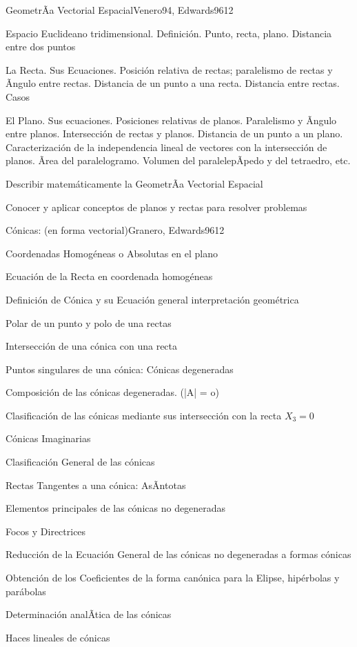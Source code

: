 \begin{syllabus}
\begin{unit}{GeometrÃ­a Vectorial Espacial}{Venero94, Edwards96}{12}
\begin{topics}
      \item Espacio Euclideano tridimensional. Definición. Punto, recta, plano. Distancia entre dos puntos
      \item La Recta. Sus Ecuaciones. Posición relativa de rectas; paralelismo de rectas y Ãngulo entre rectas. Distancia de un punto a una recta. Distancia entre rectas. Casos
      \item El Plano. Sus ecuaciones. Posiciones relativas de planos. Paralelismo y Ãngulo entre planos. Intersección de rectas y planos. Distancia de un punto a un plano. Caracterización de la independencia lineal de  vectores con la intersección de planos. Ãrea del paralelogramo. Volumen del paralelepÃ­pedo y del tetraedro, etc.
	\end{topics}

   \begin{unitgoals}
      \item Describir matemáticamente la GeometrÃ­a Vectorial Espacial
      \item Conocer y aplicar conceptos de planos y rectas para resolver problemas
   \end{unitgoals}
\end{unit}

\begin{unit}{Cónicas: (en forma vectorial)}{Granero, Edwards96}{12}
\begin{topics}
      	\item Coordenadas Homogéneas o Absolutas en el plano
	\item Ecuación de la Recta en coordenada homogéneas
	\item Definición de Cónica y su Ecuación general interpretación geométrica
	\item Polar de un punto y polo de una  rectas
	\item Intersección de una cónica con una recta
	\item Puntos singulares de una cónica: Cónicas degeneradas
	\item Composición de las cónicas degeneradas. (|A| = o)
	\item Clasificación de las cónicas mediante sus intersección con la recta $X_3 = 0$
	\item Cónicas Imaginarias
	\item Clasificación General de las cónicas
	\item Rectas Tangentes a una cónica: AsÃ­ntotas
	\item Elementos principales de las cónicas no degeneradas
	\item Focos y Directrices
	\item Reducción de la Ecuación General de las cónicas no degeneradas a formas cónicas
	\item Obtención de los Coeficientes de la forma canónica para la Elipse, hipérbolas y parábolas
	\item Determinación analÃ­tica de las cónicas
	\item Haces lineales de cónicas
   \end{topics}


\end{unit}
\end{syllabus}
